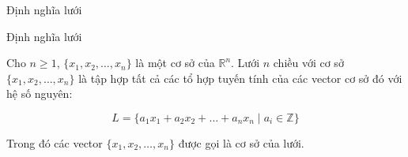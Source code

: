 \begin{frame}{Định nghĩa lưới}

\begin{block}{Định nghĩa lưới}

Cho \(n \geq 1 \), \(\{x_1, x_2, \ldots, x_n\}\) là một cơ sở của \(\mathbb{R}^n\).
Lưới \(n \) chiều với cơ sở \(\{x_1, x_2, \ldots, x_n\}\)
là tập hợp tất cả các tổ hợp tuyến tính của các vector cơ sở đó với hệ số nguyên:

$$
L = \{a_1 x_1 + a_2 x_2 + \ldots + a_n x_n \mid a_i \in \mathbb{Z} \}
$$

Trong đó các vector \(\{x_1, x_2, \ldots, x_n\}\) được gọi là cơ sở của lưới.

\end{block}

\end{frame}
